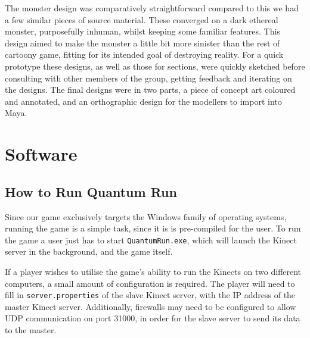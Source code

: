 \documentclass[a4paper,oneside]{memoir}
\begin{document}
				The monster design was comparatively straightforward compared to this we had a few similar pieces of source material. 
				These converged on a dark ethereal monster, purposefully inhuman, whilst keeping some familiar features. 
				This design aimed to make the monster a little bit more sinister than the rest of cartoony game, fitting for its intended goal of destroying reality. 
				For a quick prototype these designs, as well as those for sections, were quickly sketched before consulting with other members of the group, getting feedback and iterating on the designs. The final designs were in two parts, a piece of concept art coloured and annotated, and an orthographic design for the modellers to import into Maya.
                
			
	\chapter{Software}


		\section{How to Run Quantum Run}
			Since our game exclusively targets the Windows family of operating systems, running the game is a simple task, since it is is pre-compiled for the user. 
			To run the game a user just has to start \texttt{QuantumRun.exe}, which will launch the Kinect server in the background, and the game itself.

			If a player wishes to utilise the game's ability to run the Kinects on two different computers, a small amount of configuration is required.
			The player will need to fill in \texttt{server.properties} of the slave Kinect server, with the IP address of the master Kinect server.
			Additionally, firewalls may need to be configured to allow UDP communication on port 31000, in order for the slave server to send its data to the master.
\end{document}
